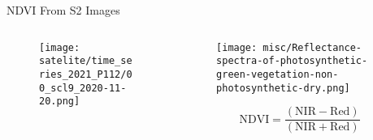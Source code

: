 \begin{frame}{NDVI From S2 Images}

	\begin{columns}
		
	\begin{column}{0.46\textwidth}
		\begin{figure}
			\vspace{-16pt}
			\texttt{[image: satelite/time\_series\_2021\_P112/00\_scl9\_2020-11-20.png]}
		\end{figure}
	\end{column}
		\begin{column}{0.46\textwidth}
			\begin{figure}
				\vspace{-1.6cm}
					\texttt{[image: misc/Reflectance-spectra-of-photosynthetic-green-vegetation-non-photosynthetic-dry.png]}
			\end{figure}
			\medskip
			$$\mathrm{NDVI}=\frac{(\mathrm{NIR}-\mathrm{Red})}{(\mathrm{NIR}+\mathrm{Red})}$$
		\end{column}
		
	\end{columns}
\end{frame}

